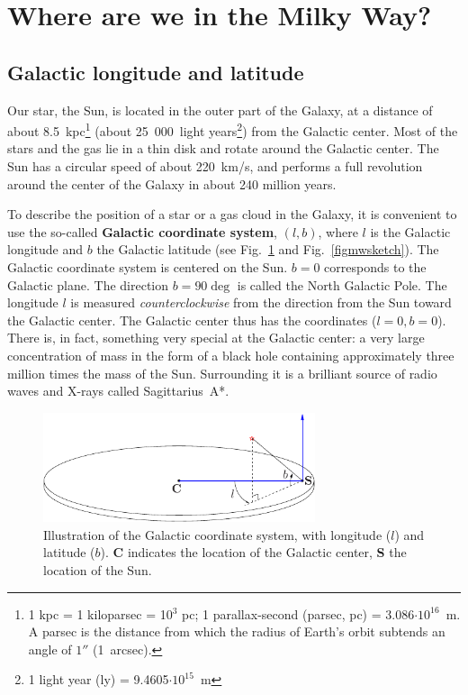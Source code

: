 \vfill\eject
\section{Where are we in the Milky Way?}
\subsection{Galactic longitude and latitude}

Our star, the Sun, is located in the outer part of the Galaxy, at a distance of
about 8.5~kpc\footnote{1 kpc = 1 kiloparsec = 10$^3$ pc; 1 parallax-second
(parsec, pc) = 3.086$\cdot 10^{16}$~m.  A parsec is the distance from which the
radius of Earth's orbit subtends an angle of $1''$ (1~arcsec).} (about
25~000~light years\footnote{1 light year (ly) = 9.4605$\cdot 10^{15}$~m}) from
the Galactic center.  Most of the stars and the gas lie in a thin disk and
rotate around the Galactic center.  The Sun has a circular speed of about
220~km/s, and performs a full revolution around the center of the Galaxy in
about 240 million years.

To describe the position of a star or a gas cloud in the Galaxy, it is
convenient to use the so-called {\bf Galactic coordinate system}, $(l,b)$,
where $l$ is the Galactic longitude and $b$ the Galactic latitude (see
Fig.~\ref{figdisc} and Fig.~\ref{figmwsketch}).  The Galactic coordinate system
is centered on the Sun.  $b=0$ corresponds to the Galactic plane. The direction
$b=90\deg$ is called the North Galactic Pole. The longitude $l$ is measured
{\it counterclockwise} from the direction from the Sun toward the Galactic
center.  The Galactic center thus has the coordinates ($l=0,b=0$).  There is,
in fact, something very special at the Galactic center: a very large
concentration of mass in the form of a black hole containing approximately
three million times the mass of the Sun.  Surrounding it is a brilliant source
of radio waves and X-rays called Sagittarius~A*. 


\begin{figure}[ht]
\begin{center}
\includegraphics[width=8cm]{../figures/galdisc.pdf}
\end{center}
\caption{Illustration of the Galactic coordinate system, with longitude ($l$) and latitude ($b$). 
{\bf C} indicates the location of the Galactic center, {\bf S} the location of the Sun.}
\label{figdisc}
\end{figure} 

